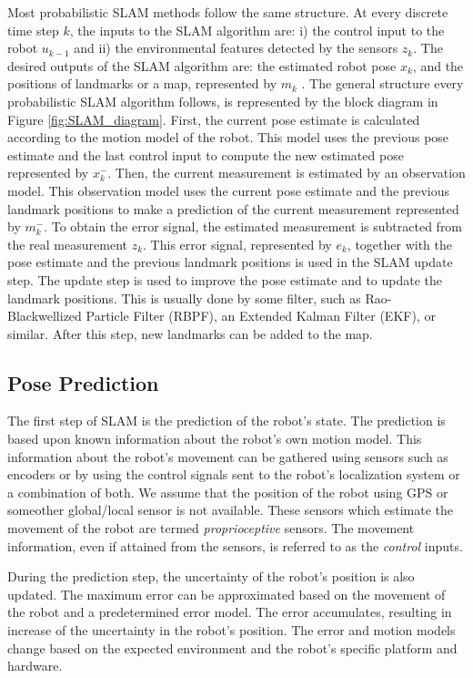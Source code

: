 Most probabilistic SLAM methods follow the same structure. At every discrete time step $ k $, the inputs to the SLAM algorithm are: i) the control input to the robot $ u_{k-1} $ and ii) the environmental features detected by the sensors $ z_k $. The desired outputs of the SLAM algorithm are: the estimated robot pose $ x_k $, and the positions of landmarks or a map, represented by $ m_k $ . The general structure every probabilistic SLAM algorithm follows, is represented by the block diagram in Figure \ref{fig:SLAM_diagram}. First, the current pose estimate is calculated according to the motion model of the robot. This model uses the previous pose estimate and the last control input to compute the new estimated pose represented by $ x_k^- $. Then, the current measurement is estimated by an observation model. This observation model uses the current pose estimate and the previous landmark positions to make a prediction of the current measurement represented by $ m_k^- $. To obtain the error signal, the estimated measurement is subtracted from the real measurement $ z_k $. This error signal, represented by $ e_k $, together with the pose estimate and the previous landmark positions is used in the SLAM update step. The update step is used to improve the pose estimate and to update the landmark positions. This is usually done by some filter, such as Rao-Blackwellized Particle Filter (RBPF), an Extended Kalman Filter (EKF), or similar. After this step, new landmarks can be added to the map. 

\subsection{Pose Prediction}

The first step of SLAM is the prediction of the robot's state. The prediction is based upon known information about the robot's own motion model. This information about the robot's movement can be gathered using sensors such as encoders or by using the control signals sent to the robot's localization system or a combination of both. We assume that the position of the robot using GPS or someother global/local sensor is not available. These sensors which estimate the movement of the robot are termed \textit{proprioceptive} sensors. The movement information, even if attained from the sensors, is referred to as the \textit{control} inputs.

During the prediction step, the uncertainty of the robot's position is also updated. The maximum error can be approximated based on the movement of the robot and a predetermined error model. The error accumulates, resulting in increase of the uncertainty in the robot's position. The error and motion models change based on the expected environment and the robot's specific platform and hardware.

